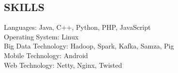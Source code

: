 \documentclass[mm, 7pt]{resume} %
\begin{document}
\begin{resume}
\section{SKILLS}

Languages:             \hfill  Java, C++, Python, PHP, JavaScript  \\
Operating System:     \hfill  Linux \\
Big Data Technology:   \hfill Hadoop, Spark, Kafka, Samza, Pig \\
Mobile Technology:    \hfill  Android \\
Web Technology:       \hfill  Netty, Nginx, Twisted \\

\end{resume}
\end{document}
